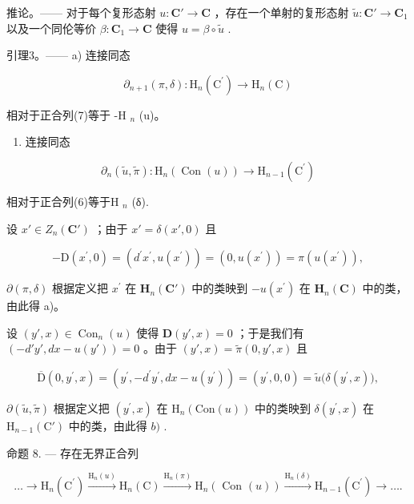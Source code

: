 推论。—— 对于每个复形态射 \(u: \mathbf{C}' \to \mathbf{C}\) ，存在一个单射的复形态射 \(\tilde{u}: \mathbf{C}' \to \mathbf{C}_1\) 以及一个同伦等价 \(\beta: \mathbf{C}_1 \to \mathbf{C}\) 使得 \(u = \beta \circ \tilde{u}\) .

引理3。—— a) 连接同态

\[
\partial_ {n + 1} (\pi , \delta): \mathrm{H} _ {n} (\mathrm{C} ^ {\prime}) \rightarrow \mathrm{H} _ {n} (\mathrm{C})
\]

相对于正合列(7)等于 -H \(_{n}\) (u)。

\begin{enumerate}
\def\labelenumi{\alph{enumi})}
\setcounter{enumi}{1}
\tightlist
\item
  连接同态
\end{enumerate}

\[
\partial_ {n} (\tilde {u}, \tilde {\pi}): \mathrm{H} _ {n} (\operatorname{Con} (u)) \rightarrow \mathrm{H} _ {n - 1} (\mathrm{C} ^ {\prime})
\]

相对于正合列(6)等于H \(_{n}\) (δ).

设 \(x' \in Z_n(\mathbf{C}')\) ；由于 \(x' = \delta(x', 0)\) 且

\[
- \mathrm{D} (x ^ {\prime}, 0) = (d ^ {\prime} x ^ {\prime}, u (x ^ {\prime})) = (0, u (x ^ {\prime})) = \pi (u (x ^ {\prime})),
\]

\(\partial (\pi ,\delta)\) 根据定义把 \(x^{\prime}\) 在 \(\mathbf{H}_n(\mathbf{C}')\) 中的类映到 \(-u(x^{\prime})\) 在 \(\mathbf{H}_n(\mathbf{C})\) 中的类，由此得 a)。

设 \((y', x) \in \operatorname{Con}_n(u)\) 使得 \(\mathbf{D}(y', x) = 0\) ；于是我们有 \((-d'y', dx - u(y')) = 0\) 。由于 \((y', x) = \tilde{\pi}(0, y', x)\) 且

\[
\overline {{{\mathrm{D}}}} (0, y ^ {\prime}, x) = \left(y ^ {\prime}, - d ^ {\prime} y ^ {\prime}, d x - u (y ^ {\prime})\right) = \left(y ^ {\prime}, 0, 0\right) = \tilde {u} \big (\delta (y ^ {\prime}, x) \big),
\]

\(\partial (\tilde{u},\tilde{\pi})\) 根据定义把 \((y^{\prime},x)\) 在 \(\mathrm{H}_n(\mathrm{Con}(u))\) 中的类映到 \(\delta (y^{\prime},x)\) 在 \(\mathrm{H}_{n - 1}(\mathrm{C}')\) 中的类，由此得 \(b)\) .

命题 8. --- 存在无界正合列

\[
\dots \longrightarrow \mathrm{H} _ {n} (\mathrm{C} ^ {\prime}) \xrightarrow {\mathrm{H} _ {n} (u)} \mathrm{H} _ {n} (\mathrm{C}) \xrightarrow {\mathrm{H} _ {n} (\pi)} \mathrm{H} _ {n} (\text { Con } (u)) \xrightarrow {\mathrm{H} _ {n} (\delta)} \mathrm{H} _ {n - 1} (\mathrm{C} ^ {\prime}) \longrightarrow \dots .\tag{8}
\]

